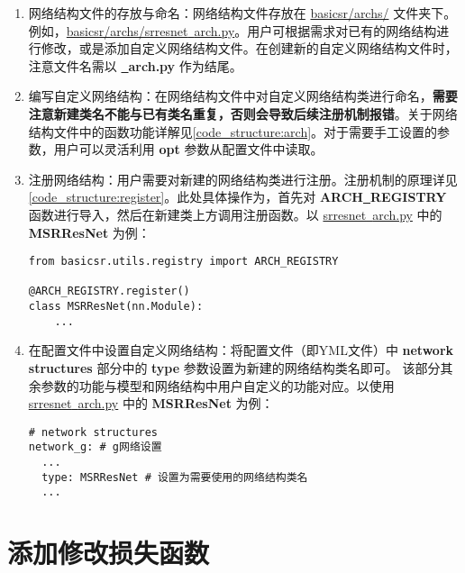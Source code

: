 \documentclass[../main.tex]{subfiles}
\begin{document}
\begin{enumerate}
	\item 网络结构文件的存放与命名：网络结构文件存放在 \href{https://github.com/XPixelGroup/BasicSR/tree/master/basicsr/archs}{basicsr/archs/} 文件夹下。例如，\href{https://github.com/XPixelGroup/BasicSR/tree/master/basicsr/archs}{basicsr/archs/srresnet\underline{~}arch.py}。用户可根据需求对已有的网络结构进行修改，或是添加自定义网络结构文件。在创建新的自定义网络结构文件时，注意文件名需以  \textbf{\underline{~}arch.py} 作为结尾。
	
	\item 编写自定义网络结构：在网络结构文件中对自定义网络结构类进行命名，\textbf{需要注意新建类名不能与已有类名重复，否则会导致后续注册机制报错}。关于网络结构文件中的函数功能详解见\ref{code_structure:arch}。对于需要手工设置的参数，用户可以灵活利用 \textbf{opt} 参数从配置文件中读取。
	
	\item 注册网络结构：用户需要对新建的网络结构类进行注册。注册机制的原理详见\ref{code_structure:register}。此处具体操作为，首先对 \textbf{ARCH\underline{~}REGISTRY} 函数进行导入，然后在新建类上方调用注册函数。以 \href{https://github.com/XPixelGroup/BasicSR/tree/master/basicsr/archs/srresnet_arch.py}{srresnet\underline{~}arch.py} 中的 \textbf{MSRResNet} 为例：
\begin{verbatim}
from basicsr.utils.registry import ARCH_REGISTRY

@ARCH_REGISTRY.register()
class MSRResNet(nn.Module):
    ...
\end{verbatim}
	
	\item 在配置文件中设置自定义网络结构：将配置文件（即YML文件）中 \textbf{network structures} 部分中的 \textbf{type} 参数设置为新建的网络结构类名即可。
	该部分其余参数的功能与模型和网络结构中用户自定义的功能对应。以使用 \href{https://github.com/XPixelGroup/BasicSR/tree/master/basicsr/archs/srresnet_arch.py}{srresnet\underline{~}arch.py} 中的 \textbf{MSRResNet} 为例：
\begin{verbatim}
# network structures
network_g: # g网络设置
  ...
  type: MSRResNet # 设置为需要使用的网络结构类名
  ...
\end{verbatim}
\end{enumerate}

\section{添加修改损失函数}\label{howto:add_loss}
\end{document}
